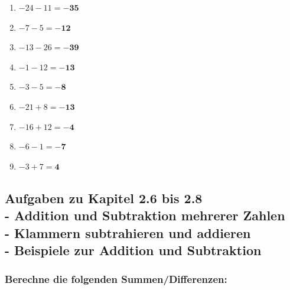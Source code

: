 \documentclass[a4paper,12pt]{article} %
\begin{document}
\begin{enumerate}
  \item \(-24 - 11 = \mathbf{-35}\) %

  \item \(-7 - 5 = \mathbf{-12}\) %

  \item \(-13 - 26 = \mathbf{-39}\) %

  \item \(-1 - 12 = \mathbf{-13}\) %

  \item \(-3 - 5 = \mathbf{-8}\) %

  \item \(-21 + 8 = \mathbf{-13}\) %

  \item \(-16 + 12 = \mathbf{-4}\) %

  \item \(-6 - 1 = \mathbf{-7}\) %

  \item \(-3 + 7 = \mathbf{4}\) %

\end{enumerate}

\subsection{Aufgaben zu Kapitel 2.6 bis 2.8 \\
  - Addition und Subtraktion mehrerer Zahlen \\
  - Klammern subtrahieren und addieren \\
  - Beispiele zur Addition und Subtraktion}

\subsubsection{Berechne die folgenden Summen/Differenzen:} %
\end{document}
